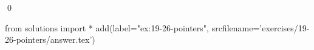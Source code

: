 
\begin{ex}
  \label{ex:19-26-pointers}
  
  \qed
\end{ex}
\begin{python0}
from solutions import *
add(label="ex:19-26-pointers",
    srcfilename='exercises/19-26-pointers/answer.tex')
\end{python0}
